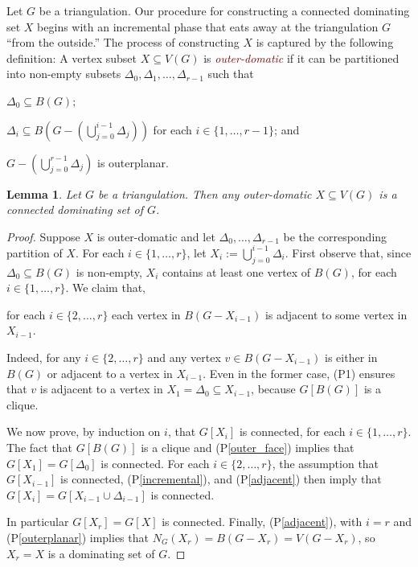 \documentclass[12pt]{article}
\newcommand{\pref}[1]{(P\ref{#1})}
\newtheorem{lem}{Lemma}
\newcommand{\defin}[1]{\emph{\textcolor{Maroon}{#1}}}
\theoremstyle{definition}
\begin{document}
Let $G$ be a triangulation.  Our procedure for constructing a connected dominating set $X$ begins with an incremental phase that eats away at the triangulation $G$ ``from the outside.'' The process of constructing $X$ is captured by the following definition:   A vertex subset $X\subseteq V(G)$ is \defin{outer-domatic} if it can be partitioned into non-empty subsets $\Delta_0,\Delta_1,\ldots,\Delta_{r-1}$ such that
\begin{compactenum}[(P1)]
    \item $\Delta_0\subseteq B(G)$; \label{outer_face}
    \item $\Delta_i\subseteq B(G-(\bigcup_{j=0}^{i-1}\Delta_j))$ for each $i\in\{1,\ldots,r-1\}$; and \label{incremental}
    \item $G-(\bigcup_{j=0}^{r-1}\Delta_j)$ is outerplanar. \label{outerplanar}
\end{compactenum}

\begin{lem}\label{outer_domatic}
    Let $G$ be a triangulation.  Then any outer-domatic $X\subseteq V(G)$ is a connected dominating set of $G$.
\end{lem}

\begin{proof}
  Suppose $X$ is outer-domatic and let $\Delta_0,\ldots,\Delta_{r-1}$ be the corresponding partition of $X$.  For each $i\in\{1,\ldots,r\}$, let $X_i:=\bigcup_{j=0}^{i-1} \Delta_i$.  First observe that, since $\Delta_0\subseteq B(G)$ is non-empty, $X_i$ contains at least one vertex of $B(G)$, for each $i\in\{1,\ldots,r\}$. We claim that,
  \begin{compactenum}[(P1)]\setcounter{enumi}{3}
    \item for each $i\in\{2,\ldots,r\}$ each vertex in $B(G-X_{i-1})$ is adjacent to some vertex in $X_{i-1}$. \label{adjacent}
  \end{compactenum}
  Indeed, for any $i\in\{2,\ldots,r\}$ and any vertex $v\in B(G-X_{i-1})$ is either in $B(G)$ or adjacent to a vertex in $X_{i-1}$. Even in the former case, (P1) ensures that $v$ is adjacent to a vertex in $X_1=\Delta_0\subseteq X_{i-1}$, because $G[B(G)]$ is a clique.

  We now prove, by induction on $i$, that $G[X_i]$ is connected, for each $i\in\{1,\ldots,r\}$.
  The fact that $G[B(G)]$ is a clique and \pref{outer_face} implies that $G[X_1]=G[\Delta_0]$ is connected. For each $i\in\{2,\ldots,r\}$, the assumption that $G[X_{i-1}]$ is connected, \pref{incremental}, and \pref{adjacent} then imply that $G[X_i]=G[X_{i-1}\cup\Delta_{i-1}]$ is connected.

  In particular $G[X_r]=G[X]$ is connected.  Finally, \pref{adjacent}, with $i=r$ and \pref{outerplanar} implies that $N_G(X_r)=B(G-X_r)=V(G-X_r)$, so $X_r=X$ is a dominating set of $G$.
\end{proof}
\end{document}
